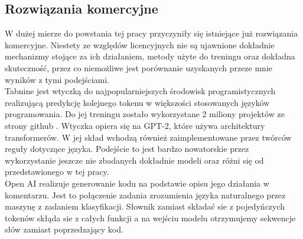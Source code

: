 \subsection {Rozwiązania komercyjne}
W dużej mierze do powstania tej pracy przyczyniły się istniejące już rozwiązania komercyjne. Niestety 
ze względów licencyjnych nie są ujawnione dokładnie mechanizmy stojące za ich działaniem, metody użyte 
do treningu oraz dokładna skuteczność, przez co niemożliwe jest porównanie uzyskanych przeze mnie wyników 
z tymi podejściami. \\

Tabnine \cite{tabnine} jest wtyczką do najpopularniejszych środowisk programistycznych realizującą predykcję kolejnego tokenu w 
większości stosowanych języków programowania. Do jej treningu zostało wykorzystane 2 miliony projektów ze strony github \cite{github}. 
Wtyczka opiera się na GPT-2, które używa architektury transformerów. W jej skład wchodzą również zaimplementowane przez twórców
reguły dotyczące języka. Podejście to jest bardzo nowatorskie przez wykorzystanie jeszcze nie zbadanych dokładnie modeli oraz 
różni się od przedstawionego w tej pracy.\\

Open AI realizuje generowanie kodu na podstawie opisu jego działania w komentarzu. Jest to połączenie zadania zrozumienia 
języka naturalnego przez maszynę z zadaniem klasyfikacji. Słownik zamiast składać sie z pojedyńczych tokenów skłąda sie z całych funkcji 
a na wejściu modelu otrzymujemy sekwencje słów zamiast poprzedzający kod. 

